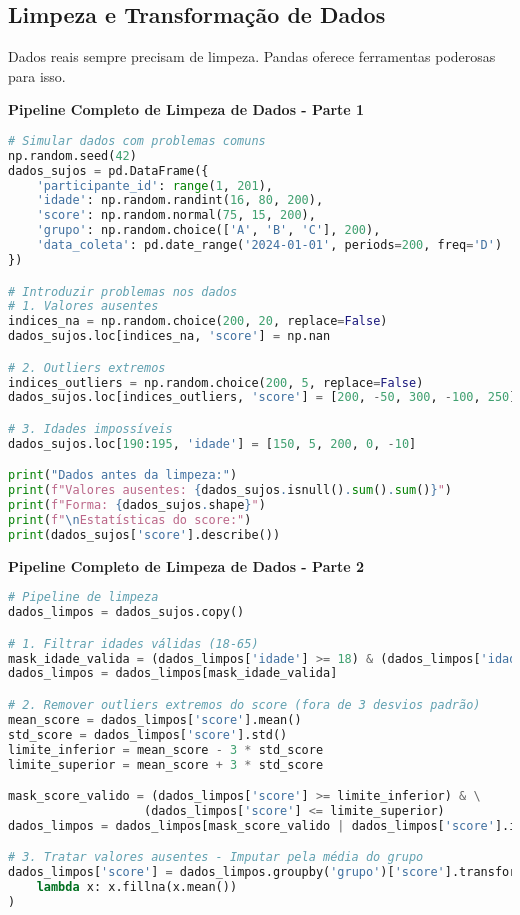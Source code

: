 \subsection{Limpeza e Transformação de Dados}

Dados reais sempre precisam de limpeza. Pandas oferece ferramentas poderosas para isso.

\begin{examplebox}
\textbf{Pipeline Completo de Limpeza de Dados - Parte 1}

\begin{lstlisting}[language=Python]
# Simular dados com problemas comuns
np.random.seed(42)
dados_sujos = pd.DataFrame({
    'participante_id': range(1, 201),
    'idade': np.random.randint(16, 80, 200),
    'score': np.random.normal(75, 15, 200),
    'grupo': np.random.choice(['A', 'B', 'C'], 200),
    'data_coleta': pd.date_range('2024-01-01', periods=200, freq='D')
})

# Introduzir problemas nos dados
# 1. Valores ausentes
indices_na = np.random.choice(200, 20, replace=False)
dados_sujos.loc[indices_na, 'score'] = np.nan

# 2. Outliers extremos
indices_outliers = np.random.choice(200, 5, replace=False)
dados_sujos.loc[indices_outliers, 'score'] = [200, -50, 300, -100, 250]

# 3. Idades impossíveis
dados_sujos.loc[190:195, 'idade'] = [150, 5, 200, 0, -10]

print("Dados antes da limpeza:")
print(f"Valores ausentes: {dados_sujos.isnull().sum().sum()}")
print(f"Forma: {dados_sujos.shape}")
print(f"\nEstatísticas do score:")
print(dados_sujos['score'].describe())
\end{lstlisting}
\end{examplebox}

\begin{examplebox}
\textbf{Pipeline Completo de Limpeza de Dados - Parte 2}

\begin{lstlisting}[language=Python]
# Pipeline de limpeza
dados_limpos = dados_sujos.copy()

# 1. Filtrar idades válidas (18-65)
mask_idade_valida = (dados_limpos['idade'] >= 18) & (dados_limpos['idade'] <= 65)
dados_limpos = dados_limpos[mask_idade_valida]

# 2. Remover outliers extremos do score (fora de 3 desvios padrão)
mean_score = dados_limpos['score'].mean()
std_score = dados_limpos['score'].std()
limite_inferior = mean_score - 3 * std_score
limite_superior = mean_score + 3 * std_score

mask_score_valido = (dados_limpos['score'] >= limite_inferior) & \
                   (dados_limpos['score'] <= limite_superior)
dados_limpos = dados_limpos[mask_score_valido | dados_limpos['score'].isnull()]

# 3. Tratar valores ausentes - Imputar pela média do grupo
dados_limpos['score'] = dados_limpos.groupby('grupo')['score'].transform(
    lambda x: x.fillna(x.mean())
)
\end{lstlisting}
\end{examplebox}

